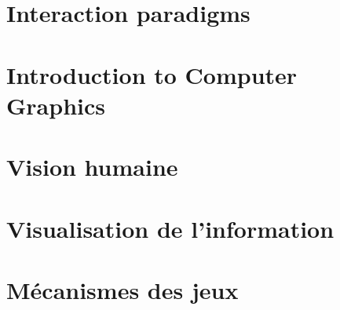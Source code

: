\documentclass[a4paper,11pt]{article}
\theoremstyle{theorem-style}  %
\theoremstyle{definition-style}
\begin{document}
\tableofcontents
\section{Interaction paradigms}

\section{Introduction to Computer Graphics}

\section{Vision humaine}

\section{Visualisation de l'information}

\section{M\'ecanismes des jeux}

\end{document}
